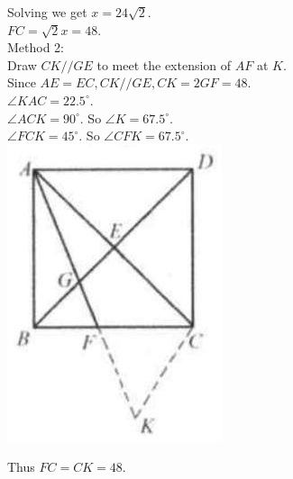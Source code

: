 \documentclass[10pt]{article}
\begin{document}
Solving we get \(x=24 \sqrt{2}\).\\
\(F C=\sqrt{2} x=48\).\\
Method 2:\\
Draw \(C K / / G E\) to meet the extension of \(A F\) at \(K\).\\
Since \(A E=E C, C K / / G E, C K=2 G F=48\).\\
\(\angle K A C=22.5^{\circ}\).\\
\(\angle A C K=90^{\circ}\). So \(\angle K=67.5^{\circ}\).\\
\(\angle F C K=45^{\circ}\). So \(\angle C F K=67.5^{\circ}\).\\
\includegraphics[max width=\textwidth, center]{2025_04_17_97bc1f7e44d93c271a88g-109(1)}

Thus \(F C=C K=48\).
\end{document}
